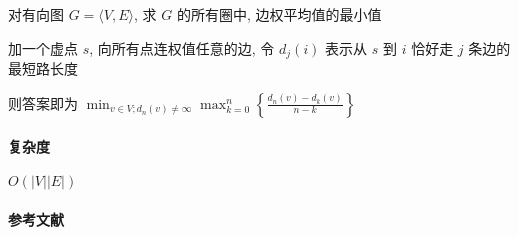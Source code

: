 对有向图 \(G=\langle V,E\rangle\), 求 \(G\) 的所有圈中, 边权平均值的最小值

加一个虚点 \(s\), 向所有点连权值任意的边, 令 \(d_j(i)\) 表示从 \(s\) 到 \(i\) 恰好走 \(j\) 条边的最短路长度

则答案即为 \(\displaystyle\min_{v\in V;d_n(v)\neq\infty}\max_{k=0}^{n}\left\{\frac{d_n(v)-d_k(v)}{n-k}\right\}\)

\paragraph{复杂度} \(O(|V||E|)\)

\paragraph{参考文献} \cite{karp1978characterization}
